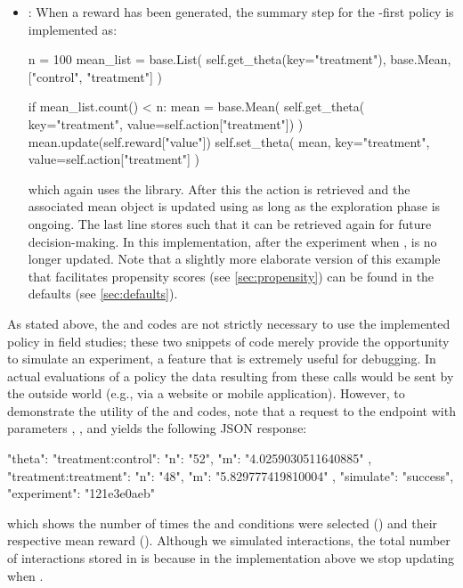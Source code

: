 \documentclass[nojss]{jss}
\begin{document}
\begin{itemize}
\item {}: When a reward has been generated, the summary step for the -first policy is implemented as:
\begin{Code}
n = 100
mean_list = base.List(
    self.get_theta(key="treatment"), 
    base.Mean, ["control", "treatment"]
    )

if mean_list.count() < n:
    mean = base.Mean(
         self.get_theta(
         key="treatment", value=self.action["treatment"])
         )
    mean.update(self.reward["value"])
    self.set_theta(
         mean, key="treatment", 
         value=self.action["treatment"]
         )
\end{Code}
which again uses the  library. After this the action is retrieved and the associated mean object is updated using  as long as the exploration phase is ongoing. The last line stores  such that it can be retrieved again for future decision-making. In this implementation, after the experiment when ,  is no longer updated. Note that a slightly more elaborate version of this example that facilitates propensity scores (see \ref{sec:propensity}) can be found in the defaults (see
\ref{sec:defaults}).

\end{itemize} 

As stated above, the  and  codes are not strictly necessary to use the implemented policy in field  studies; these two snippets of code merely provide the opportunity to simulate an experiment, a feature that is extremely useful for debugging. In actual evaluations of a policy the data resulting from these calls would be sent by the outside world (e.g., via a website or mobile application). However, to demonstrate the utility of the  and  codes, note that a request to the endpoint  with parameters , , and  yields the following JSON response:
\begin{Code}
{
    "theta": {
        "treatment:control": {
            "n": "52",
            "m": "4.0259030511640885"
        },
        "treatment:treatment": {
            "n": "48",
            "m": "5.829777419810004"
        }
    },
    "simulate": "success",
    "experiment": "121e3e0aeb"
}
\end{Code}
which shows the number of times the  and  conditions were selected () and their respective mean reward (). Although we simulated  interactions, the total number of interactions stored in  is  because in the implementation above we stop updating  when .
\end{document}
